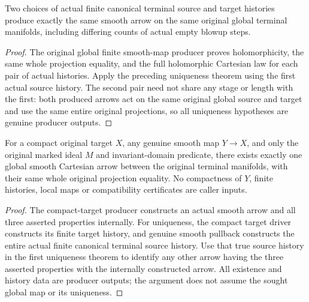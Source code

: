 \begin{theorem}
\label{hir:original-global-finite-smooth-map-history-choice-independent}
\leanok
{}
Two choices of actual finite canonical terminal source and target histories
produce exactly the same smooth arrow on the same original global terminal
manifolds, including differing counts of actual empty blowup steps.
\end{theorem}
\begin{proof}
The original global finite smooth-map producer proves holomorphicity, the
same whole projection equality, and the full holomorphic Cartesian law
for each pair of actual histories. Apply the preceding uniqueness theorem
using the first actual source history. The second pair need not share any
stage or length with the first: both produced arrows act on the same
original global source and target and use the same entire original
projections, so all uniqueness hypotheses are genuine producer outputs.
\end{proof}

\begin{theorem}
\label{hir:original-compact-global-terminal-smooth-arrow-existsUnique}
\leanok
{}
For a compact original target $X$, any genuine smooth map $Y\to X$, and
only the original marked ideal $M$ and invariant-domain predicate, there
exists exactly one global smooth Cartesian arrow between the original
terminal manifolds, with their same whole original projection equality.
No compactness of $Y$, finite histories, local maps or compatibility
certificates are caller inputs.
\end{theorem}
\begin{proof}
The compact-target producer constructs an actual smooth arrow and all
three asserted properties internally. For uniqueness, the compact target
driver constructs its finite target history, and genuine smooth pullback
constructs the entire actual finite canonical terminal source history.
Use that true source history in the first uniqueness theorem to identify
any other arrow having the three asserted properties with the internally
constructed arrow. All existence and history data are producer outputs;
the argument does not assume the sought global map or its uniqueness.
\end{proof}
